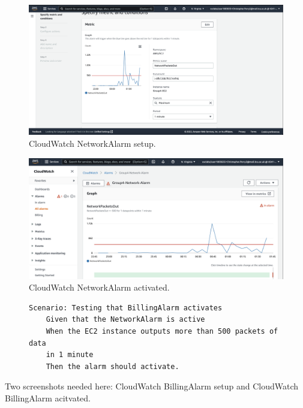 \begin{figure}[!htbp]
    \centering
    \includegraphics[width=\textwidth]{resources/cloudwatch/cloudwatch-network-alarm-setup}
    \caption{CloudWatch NetworkAlarm setup.}
    \label{fig:cloudwatch-network-alarm-setup}
\end{figure}

\begin{figure}[!htbp]
    \centering
    \includegraphics[width=\textwidth]{resources/cloudwatch/cloudwatch-network-alarm-active}
    \caption{CloudWatch NetworkAlarm activated.}
    \label{fig:cloudwatch-network-alarm-active}
\end{figure}

\begin{figure}[!htbp]
    \centering
    \begin{verbatim}
Scenario: Testing that BillingAlarm activates
    Given that the NetworkAlarm is active
    When the EC2 instance outputs more than 500 packets of data
    in 1 minute
    Then the alarm should activate.
    \end{verbatim}
    \label{fig:cloudwatch-network-alarm-test-2}
\end{figure}

Two screenshots needed here: CloudWatch BillingAlarm setup and CloudWatch BillingAlarm acitvated.

